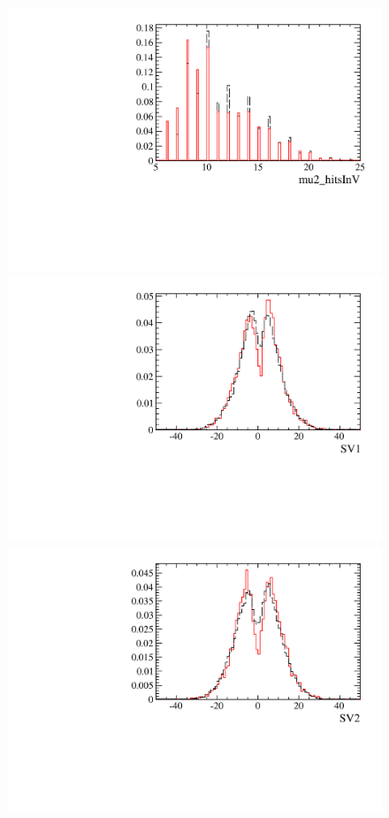 \begin{figure} [htb!]
\begin{center}
\includegraphics[scale=0.20]{figs/mu2_hitsInVPARTIALptcut.pdf}
\includegraphics[scale=0.20]{figs/SV1PARTIALptcut.pdf}
\includegraphics[scale=0.20]{figs/SV2PARTIALptcut.pdf}

\end{center}
\end{figure}
